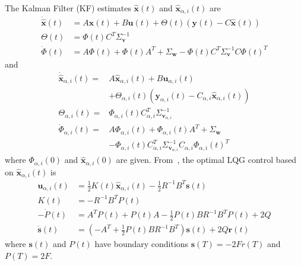 \documentclass[journal]{IEEEtran}
\begin{document}
The Kalman Filter (KF) estimates $\hat{\mathbf{x}}(t)$ and $\hat{\mathbf{x}}_{\alpha,i}(t)$ are~\cite{anderson2007optimal}
\begin{equation*}
\label{eq:dynamics-x-hat}
    \begin{array}{ll}
        \dot{\hat{\mathbf{x}}}(t) &= A\hat{\mathbf{x}}(t) + B\mathbf{u}(t) + \Theta(t)(\mathbf{y}(t) - C\hat{\mathbf{x}}(t)) \\
        \Theta(t) &= \Phi(t)C^{T}\Sigma_{\mathbf{v}}^{-1} \\
        \dot{\Phi}(t) &= A\Phi(t) + \Phi(t)A^{T} + \Sigma_{\mathbf{w}} - \Phi(t)C^{T}\Sigma_{\mathbf{v}}^{-1}C\Phi(t)^{T}
    \end{array}
\end{equation*}
and
\begin{align}
    \label{eq:dynamics-x-hat1}
    \dot{\hat{\mathbf{x}}}_{\alpha,i}(t) =& A\hat{\mathbf{x}}_{\alpha,i}(t) + B\mathbf{u}_{\alpha,i}(t)\nonumber \\ 
    &+ \Theta_{\alpha,i}(t)(\mathbf{y}_{\alpha,i}(t) - C_{\alpha,i}\hat{\mathbf{x}}_{\alpha,i}(t))\\
    \label{eq:dynamics-x-hat2}
    \Theta_{\alpha,i}(t) =& \Phi_{\alpha,i}(t)C_{\alpha,i}^{T}\Sigma_{\mathbf{v}_{\alpha,i}}^{-1} \\
    \dot{\Phi}_{\alpha,i}(t) =& A\Phi_{\alpha,i}(t) + \Phi_{\alpha,i}(t)A^{T} + \Sigma_{\mathbf{w}}\nonumber \\
    \label{eq:dynamics-x-hat3}
    &- \Phi_{\alpha,i}(t)C_{\alpha,i}^{T}\Sigma_{\mathbf{v}_{\alpha,i}}^{-1}C_{\alpha,i}\Phi_{\alpha,i}(t)^{T}
\end{align}
where $\Phi_{\alpha,i}(0)$ and $\hat{\mathbf{x}}_{\alpha,i}(0)$ are given.
From~\cite{anderson2007optimal}, the optimal LQG control based on $\hat{\mathbf{x}}_{\alpha,i}(t)$ is
\begin{align}
    \label{eq:controller-attack-free1}
    \mathbf{u}_{\alpha,i}(t) &= \frac{1}{2}K(t)\hat{\mathbf{x}}_{\alpha,i}(t) - \frac{1}{2}R^{-1}B^{T}\mathbf{s}(t) \\
    \label{eq:controller-attack-free2}
    K(t) &= -R^{-1}B^{T}P(t) \\
    \label{eq:controller-attack-free3}
    -\dot{P}(t) &= A^{T}P(t) + P(t)A - \frac{1}{2}P(t)BR^{-1}B^{T}P(t) + 2Q \\
    \label{eq:controller-attack-free4}
    \dot{\mathbf{s}}(t) &= (-A^{T} + \frac{1}{2}P(t)BR^{-1}B^{T})\mathbf{s}(t) + 2Q\mathbf{r}(t)    
\end{align}
where $\mathbf{s}(t)$ and $P(t)$ have boundary conditions $\mathbf{s}(T) = -2Fr(T)$ and $P(T) = 2F$.
\end{document}
